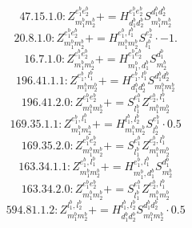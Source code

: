 \documentclass[letterpaper,10pt,fleqn,leqno,onecolumn]{article}
\begin{document}
\begin{equation} \;\;\;\;\;\;  47.15.1.0: Z^{e_{1}^{b}e_{2}^{b}}_{m_{1}^{b}m_{2}^{b}}+=H^{e_{1}^{b}e_{2}^{b}}_{d_{1}^{b}d_{2}^{b}}S^{d_{1}^{b}d_{2}^{b}}_{m_{1}^{b}m_{2}^{b}} \end{equation}
\begin{equation} \;\;\;\;\;\;  20.8.1.0: Z^{e_{1}^{b}e_{2}^{b}}_{m_{1}^{b}m_{2}^{b}}+=H^{e_{1}^{b},l_{1}^{b}}_{m_{1}^{b}m_{2}^{b}}S^{e_{2}^{b}}_{l_{1}^{b}}\cdot -1. \end{equation}
\begin{equation} \;\;\;\;\;\;  16.7.1.0: Z^{e_{1}^{b}e_{2}^{b}}_{m_{1}^{b}m_{2}^{b}}+=H^{e_{1}^{b}e_{2}^{b}}_{m_{1}^{b},d_{1}^{b}}S^{d_{1}^{b}}_{m_{2}^{b}} \end{equation}
\begin{equation} \;\;\;\;\;\;  196.41.1.1: Z^{e_{1}^{b},l_{1}^{b}}_{m_{1}^{b}m_{2}^{b}}+=H^{e_{1}^{b},l_{1}^{b}}_{d_{1}^{b}d_{2}^{b}}S^{d_{1}^{b}d_{2}^{b}}_{m_{1}^{b}m_{2}^{b}} \end{equation}
\begin{equation} \;\;\;\;\;\;  196.41.2.0: Z^{e_{1}^{b}e_{2}^{b}}_{m_{1}^{b}m_{2}^{b}}+=S^{e_{1}^{b}}_{l_{1}^{b}}Z^{e_{2}^{b},l_{1}^{b}}_{m_{1}^{b}m_{2}^{b}} \end{equation}
\begin{equation} \;\;\;\;\;\;  169.35.1.1: Z^{e_{1}^{b},l_{1}^{b}}_{m_{1}^{b}m_{2}^{b}}+=H^{l_{1}^{b},l_{2}^{b}}_{m_{1}^{b}m_{2}^{b}}S^{e_{1}^{b}}_{l_{2}^{b}}\cdot 0.5 \end{equation}
\begin{equation} \;\;\;\;\;\;  169.35.2.0: Z^{e_{1}^{b}e_{2}^{b}}_{m_{1}^{b}m_{2}^{b}}+=S^{e_{1}^{b}}_{l_{1}^{b}}Z^{e_{2}^{b},l_{1}^{b}}_{m_{1}^{b}m_{2}^{b}} \end{equation}
\begin{equation} \;\;\;\;\;\;  163.34.1.1: Z^{e_{1}^{b},l_{1}^{b}}_{m_{1}^{b}m_{2}^{b}}+=H^{e_{1}^{b},l_{1}^{b}}_{m_{1}^{b},d_{1}^{b}}S^{d_{1}^{b}}_{m_{2}^{b}} \end{equation}
\begin{equation} \;\;\;\;\;\;  163.34.2.0: Z^{e_{1}^{b}e_{2}^{b}}_{m_{1}^{b}m_{2}^{b}}+=S^{e_{1}^{b}}_{l_{1}^{b}}Z^{e_{2}^{b},l_{1}^{b}}_{m_{1}^{b}m_{2}^{b}} \end{equation}
\begin{equation} \;\;\;\;\;\;  594.81.1.2: Z^{l_{1}^{b},l_{2}^{b}}_{m_{1}^{b}m_{2}^{b}}+=H^{l_{1}^{b},l_{2}^{b}}_{d_{1}^{b}d_{2}^{b}}S^{d_{1}^{b}d_{2}^{b}}_{m_{1}^{b}m_{2}^{b}}\cdot 0.5 \end{equation}
\end{document}
